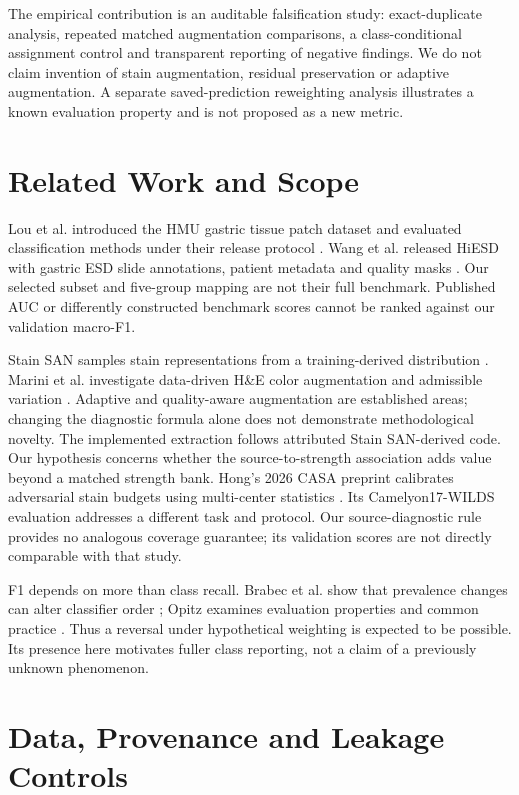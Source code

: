 \documentclass[conference]{IEEEtran}
\begin{document}
The empirical contribution is an auditable falsification study: exact-duplicate analysis, repeated matched augmentation comparisons, a class-conditional assignment control and transparent reporting of negative findings. We do not claim invention of stain augmentation, residual preservation or adaptive augmentation. A separate saved-prediction reweighting analysis illustrates a known evaluation property and is not proposed as a new metric.

\section{Related Work and Scope}
Lou et al. introduced the HMU gastric tissue patch dataset and evaluated classification methods under their release protocol \cite{lou}. Wang et al. released HiESD with gastric ESD slide annotations, patient metadata and quality masks \cite{wang}. Our selected subset and five-group mapping are not their full benchmark. Published AUC or differently constructed benchmark scores cannot be ranked against our validation macro-F1.

Stain SAN samples stain representations from a training-derived distribution \cite{kim}. Marini et al. investigate data-driven H\&E color augmentation and admissible variation \cite{marini}. Adaptive and quality-aware augmentation are established areas; changing the diagnostic formula alone does not demonstrate methodological novelty. The implemented extraction follows attributed Stain SAN-derived code. Our hypothesis concerns whether the source-to-strength association adds value beyond a matched strength bank.
Hong's 2026 CASA preprint calibrates adversarial stain budgets using multi-center statistics \cite{hong}. Its Camelyon17-WILDS evaluation addresses a different task and protocol. Our source-diagnostic rule provides no analogous coverage guarantee; its validation scores are not directly comparable with that study.

F1 depends on more than class recall. Brabec et al. show that prevalence changes can alter classifier order \cite{brabec}; Opitz examines evaluation properties and common practice \cite{opitz}. Thus a reversal under hypothetical weighting is expected to be possible. Its presence here motivates fuller class reporting, not a claim of a previously unknown phenomenon.

\section{Data, Provenance and Leakage Controls}
\end{document}
